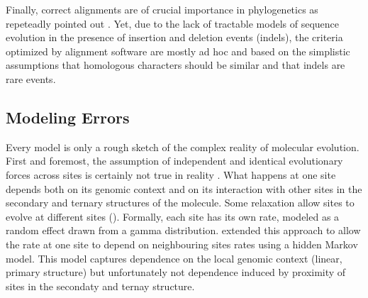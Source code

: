 
Finally, correct alignments are of crucial importance in phylogenetics as repeteadly pointed out \citep{morrison1997effects,ogden2006multiple,talavera2007improvement,wong2008alignment}. Yet, due to the lack of tractable models of sequence evolution in the presence of insertion and deletion events (indels), the criteria optimized by alignment software are mostly ad hoc  and based on the simplistic assumptions that homologous characters should be similar and that indels are rare events.


\subsection{Modeling Errors} \label{sec:modeling-errors}
%
Every model is only a rough sketch of the complex reality of molecular evolution. First and foremost, the assumption of independent and identical evolutionary forces across sites is certainly not true in reality \citep{Piau}. What happens at one site depends both on its genomic context and on its interaction with other sites in the secondary and ternary structures of the molecule. Some relaxation allow sites to evolve at different sites (\cite{goldman1994codon}). Formally, each site has its own rate, modeled as a random effect drawn from a gamma distribution. \cite{felsenstein1996hidden} extended this approach to allow the rate at one site to depend on neighbouring sites rates using a hidden Markov model. This model captures dependence on the local genomic context (linear, primary structure) but unfortunately not dependence induced by proximity of sites in the secondaty and ternay structure.

